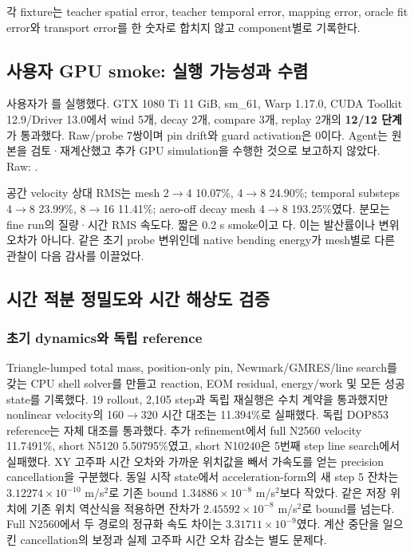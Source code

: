 \documentclass[10pt]{article}
\begin{document}
각 fixture는 teacher spatial error, teacher temporal error, mapping error, oracle fit error와 transport error를
한 숫자로 합치지 않고 component별로 기록한다.

\subsection{사용자 GPU smoke: 실행 가능성과 수렴}

사용자가 를 실행했다.
GTX 1080 Ti 11 GiB, sm\_61, Warp 1.17.0, CUDA Toolkit 12.9/Driver 13.0에서
wind 5개, decay 2개, compare 3개, replay 2개의 \textbf{12/12 단계}가 통과했다.
Raw/probe 7쌍이며 pin drift와 guard activation은 0이다. Agent는 원본을 검토·재계산했고
추가 GPU simulation을 수행한 것으로 보고하지 않았다.
Raw: .

공간 velocity 상대 RMS는 mesh 2$\to$4 10.07\%, 4$\to$8 24.90\%; temporal substeps
4$\to$8 23.99\%, 8$\to$16 11.41\%; aero-off decay mesh 4$\to$8 193.25\%였다.
분모는 fine run의 질량·시간 RMS 속도다. 짧은 0.2 s smoke이고
다. 이는 발산률이나 변위 오차가 아니다.
같은 초기 probe 변위인데 native bending energy가 mesh별로 다른 관찰이 다음 감사를 이끌었다.

\subsection{시간 적분 정밀도와 시간 해상도 검증}

\subsubsection{초기 dynamics와 독립 reference}

Triangle-lumped total mass, position-only pin, Newmark/GMRES/line search를 갖는 CPU shell solver를
만들고 reaction, EOM residual, energy/work 및 모든 성공 state를 기록했다.
19 rollout, 2,105 step과 독립 재실행은 수치 계약을 통과했지만 nonlinear velocity의
160$\to$320 시간 대조는 11.394\%로 실패했다.
독립 DOP853 reference는 자체 대조를 통과했다.
추가 refinement에서 full N2560 velocity 11.7491\%, short N5120 5.50795\%였고,
short N10240은 5번째 step line search에서 실패했다. XY 고주파 시간 오차와
가까운 위치값을 빼서 가속도를 얻는 precision cancellation을 구분했다.
동일 시작 state에서 acceleration-form의 새 step 5 잔차는
\(3.12274\times10^{-10}\) m/s\(^2\)로 기존 bound \(1.34886\times10^{-8}\) m/s\(^2\)보다 작았다.
같은 저장 위치에 기존 위치 역산식을 적용하면 잔차가 \(2.45592\times10^{-8}\) m/s\(^2\)로 bound를 넘는다.
Full N2560에서 두 경로의 정규화 속도 차이는 \(3.31711\times10^{-9}\)였다.
계산 중단을 일으킨 cancellation의 보정과 실제 고주파 시간 오차 감소는 별도 문제다.
\end{document}
